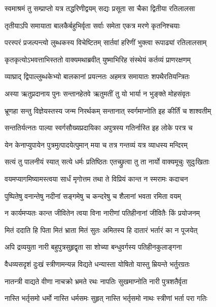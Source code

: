 \twolineshloka
{स्वमाश्रमं तु सम्प्राप्तो यत्र तद्धरिणीद्वयम्}
{सद्यः प्रसूता सा चैका द्वितीया रतिलालसा}%

\twolineshloka
{तृतीयाऽपि समायाता बालकैर्बहुभिर्वृता}
{सर्वाः समेता एकत्र मरणे कृतनिश्चयाः}%

\twolineshloka
{परस्परं प्रजल्पन्त्यो लुब्धकस्य विचेष्टितम्}
{सार्तवां हरिणीं भुक्त्वा रूपाढ्यां रतिलालसाम्}%

\twolineshloka
{कृतकृत्योऽभवत्ताभिस्ततो वाक्यमथाब्रवीत्}
{युष्माभिरिह संस्थेयं कर्तव्यं प्राणरक्षणम्}%

\twolineshloka
{व्याघ्राद् द्विपाल्लुब्धकेभ्यो बालकानां प्रयत्नतः}
{अहमत्र समायातः शपथैरतियन्त्रितः}%

\twolineshloka
{अस्या ऋतुप्रदानाय पुनः सन्तानहेतवे}
{ऋतुमतीं तु यो भार्या न भुङ्क्ते मोहसंवृतः}%

\twolineshloka
{भ्रूणहा सन्तु विज्ञेयस्तस्य जन्म निरर्थकम्}
{सन्तानात् स्वर्गमाप्नोति इह कीर्तिं च शाश्वतीम्}%

\twolineshloka
{सन्ततिर्यत्नतः पाल्या स्वर्गसौख्यप्रदायिका}
{अपुत्रस्य गतिर्नास्ति इह लोके परत्र च}%

\twolineshloka
{येन केनाप्युपायेन पुत्रमुत्पादयेत्पुमान्}
{मया च तत्र गन्तव्यं यत्र व्याधस्य मन्दिरम्}%

\twolineshloka
{सत्यं तु पालनीयं स्यात् सत्ये धर्मः प्रतिष्ठितः}
{एतच्छ्रुत्वा तु ता नार्यो वाक्यमूचुः सुदुःखिताः}%

\twolineshloka
{वयमप्यागमिष्यामस्त्वया सार्धं मृगोत्तम}
{तथा ते विप्रियं कान्त न स्मरामः कदाचन}%

\twolineshloka
{पुष्पितेषु वनान्तेषु नदीनां सङ्गमेषु च}
{कन्दरेषु च शैलानां भवता रमिता वयम्}%

\twolineshloka
{न कार्यमप्यतः कान्त जीवितेन त्वया विना}
{नारीणां पतिहीनानां जीवितैः किं प्रयोजनम्}%

\twolineshloka
{मितं ददाति हि पिता मितं भ्राता मितं सुतः}
{अमितस्य हि दातारं भर्तारं का न पूजयेत्}%

\twolineshloka
{अपि द्रव्ययुता नारी बहुपुत्रसुहृद्वृता}
{सा शोच्या बन्धुवर्गस्य पतिहीनकुलाङ्गना}%

\twolineshloka
{वैधव्यसदृशं दुःखं स्त्रीणामन्यन्न विद्यते}
{धन्यास्ता योषितो यास्तु म्रियन्ते भर्तुरग्रतः}%

\twolineshloka
{नातन्त्री वाद्यते वीणा नाचक्रो भ्रमते रथः}
{नापतिः सुखमाप्नोति नारी पुत्रशतैर्वृता}%

\twolineshloka
{नास्ति भर्तृसमो धर्मो नास्ति धर्मसमः सुहृत्}
{नास्ति भर्तृसमो नाथः स्त्रीणां भर्ता परा गतिः}%


